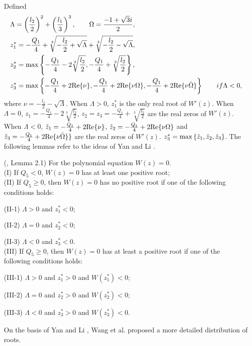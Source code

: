 \documentclass{CMHPhD-SIVD}
\begin{document}
Defined
\begin{align*}
&\Lambda=\left(\frac{l_2}{2} \right)^2+\left(\frac{l_1}{3} \right)^3,  \qquad \Omega=\frac{-1+\sqrt{3}i}{2}, \\
&z_1^*=-\frac{Q_1}{4}+\sqrt[3]{-\frac{l_2}{2}+\sqrt{\Lambda}}+\sqrt[3]{-\frac{l_2}{2}-\sqrt{\Lambda}},\\
&z_2^*={\rm max}\left\{-\frac{Q_1}{4}-2\sqrt[3]{\frac{l_2}{2}}, -\frac{Q_1}{4}+\sqrt[3]{\frac{l_2}{2}}\right\},\\
&z_3^*={\rm max}\left\{-\frac{Q_1}{4}+2{\rm Re}\{\nu\}, -\frac{Q_1}{4}+2{\rm Re}\{\nu \Omega\}, -\frac{Q_1}{4}+2{\rm Re}\{\nu \bar{\Omega}\}\right\} \qquad if \Lambda<0,\\
\end{align*}
where $\nu=-\frac{l_2}{2}-\sqrt{\Lambda}$. When $\Lambda>0$, $z_1^*$ is the only real root of $W'(z)$. When $\Lambda=0$, $z_1=-\frac{Q_1}{4}-2\sqrt[3]{\frac{l_2}{2}}$, $z_2=z_3=-\frac{Q_1}{4}+\sqrt[3]{\frac{l_2}{2}}$ are the real zeros of $W'(z)$. When $\Lambda<0$, $\hat{z}_1=-\frac{Q_1}{4}+2{\rm Re}\{\nu\}$, $\hat{z}_2=-\frac{Q_1}{4}+2{\rm Re}\{\nu\Omega\}$ and $\hat{z}_3=-\frac{Q_1}{4}+2{\rm Re}\{\nu \bar{\Omega}\}\}$ are the real zeros of $W'(z)$. $z_3^*={\rm max}\left\{\hat{z}_1, \hat{z}_2, \hat{z}_3\right\}$. The following lemmas refer to the ideas of Yan and Li \cite{yan2006stability}.

\begin{lemma}\label{3.1} (\cite{yan2006stability}, Lemma 2.1)
For the polynomial equation $W(z)=0$.\\
(I) If $Q_5<0$,  $W(z)=0$ has at least one positive root;\\
(II) If $Q_5\geq0$, then $W(z)=0$ has no positive root if one of the following conditions holds:

(II-1) $\Lambda>0$ and $z_1^*<0$;

(II-2) $\Lambda=0$ and $z_2^*<0$;

(II-3) $\Lambda<0$ and $z_3^*<0$.\\
(III) If $Q_5\geq0$, then $W(z)=0$ has at least a positive root if one of the following conditions holds:

(III-1) $\Lambda>0$ and $z_1^*>0$ and $W(z_1^*)<0$;

(III-2) $\Lambda=0$ and $z_2^*>0$ and $W(z_2^*)<0$;

(III-3) $\Lambda<0$ and $z_3^*>0$ and $W(z_3^*)<0$.
\end{lemma}


On the basis of Yan and Li \cite{yan2006stability}, Wang et al.\cite{wang2019hopf} proposed a more detailed distribution of roots.
\end{document}
